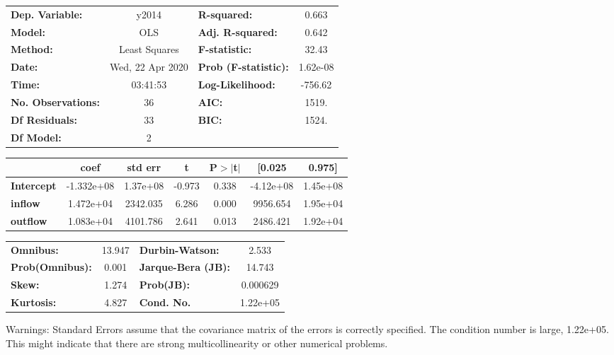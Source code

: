 \begin{center}
\begin{tabular}{lclc}
\toprule
\textbf{Dep. Variable:}    &      y2014       & \textbf{  R-squared:         } &     0.663   \\
\textbf{Model:}            &       OLS        & \textbf{  Adj. R-squared:    } &     0.642   \\
\textbf{Method:}           &  Least Squares   & \textbf{  F-statistic:       } &     32.43   \\
\textbf{Date:}             & Wed, 22 Apr 2020 & \textbf{  Prob (F-statistic):} &  1.62e-08   \\
\textbf{Time:}             &     03:41:53     & \textbf{  Log-Likelihood:    } &   -756.62   \\
\textbf{No. Observations:} &          36      & \textbf{  AIC:               } &     1519.   \\
\textbf{Df Residuals:}     &          33      & \textbf{  BIC:               } &     1524.   \\
\textbf{Df Model:}         &           2      & \textbf{                     } &             \\
\bottomrule
\end{tabular}
\begin{tabular}{lcccccc}
                   & \textbf{coef} & \textbf{std err} & \textbf{t} & \textbf{P$> |$t$|$} & \textbf{[0.025} & \textbf{0.975]}  \\
\midrule
\textbf{Intercept} &   -1.332e+08  &     1.37e+08     &    -0.973  &         0.338        &    -4.12e+08    &     1.45e+08     \\
\textbf{inflow}    &    1.472e+04  &     2342.035     &     6.286  &         0.000        &     9956.654    &     1.95e+04     \\
\textbf{outflow}   &    1.083e+04  &     4101.786     &     2.641  &         0.013        &     2486.421    &     1.92e+04     \\
\bottomrule
\end{tabular}
\begin{tabular}{lclc}
\textbf{Omnibus:}       & 13.947 & \textbf{  Durbin-Watson:     } &    2.533  \\
\textbf{Prob(Omnibus):} &  0.001 & \textbf{  Jarque-Bera (JB):  } &   14.743  \\
\textbf{Skew:}          &  1.274 & \textbf{  Prob(JB):          } & 0.000629  \\
\textbf{Kurtosis:}      &  4.827 & \textbf{  Cond. No.          } & 1.22e+05  \\
\bottomrule
\end{tabular}
\end{center}

Warnings: \newline
 [1] Standard Errors assume that the covariance matrix of the errors is correctly specified. \newline
 [2] The condition number is large, 1.22e+05. This might indicate that there are \newline
 strong multicollinearity or other numerical problems.